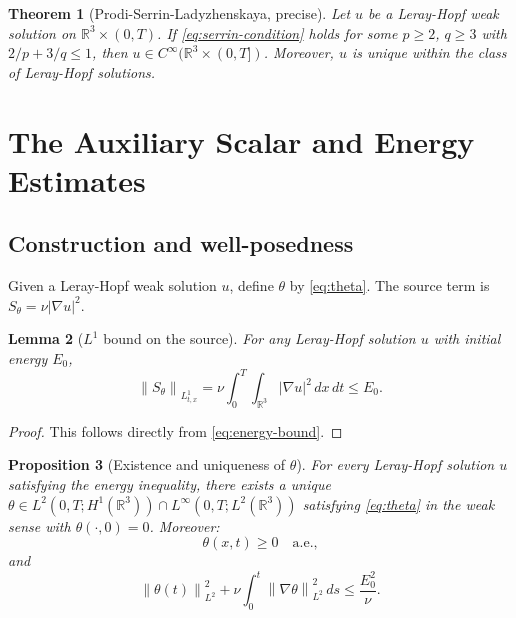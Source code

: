 \documentclass[12pt]{article}
\theoremstyle{plain}
\newtheorem{theorem}{Theorem}[section]
\newtheorem{lemma}[theorem]{Lemma}
\newtheorem{proposition}[theorem]{Proposition}
\theoremstyle{definition}
\theoremstyle{remark}
\newcommand{\R}{\mathbb{R}}
\newcommand{\norm}[1]{\left\|#1\right\|}
\newcommand{\abs}[1]{\left|#1\right|}
\newcommand{\grad}{\nabla}
\begin{document}
\begin{theorem}[Prodi-Serrin-Ladyzhenskaya, precise]\label{thm:LPS-precise}
  Let $u$ be a Leray-Hopf weak solution on $\R^3\times(0,T)$.
  If \eqref{eq:serrin-condition} holds for some $p\geq 2$, $q\geq 3$
  with $2/p+3/q\leq 1$, then $u\in C^\infty(\R^3\times(0,T])$.
  Moreover, $u$ is unique within the class of Leray-Hopf solutions.
\end{theorem}

\section{The Auxiliary Scalar and Energy Estimates}\label{sec:theta}

\subsection{Construction and well-posedness}

Given a Leray-Hopf weak solution $u$, define $\theta$ by \eqref{eq:theta}.
The source term is $S_\theta = \nu\abs{\grad u}^2$.

\begin{lemma}[$L^1$ bound on the source]\label{lem:source-L1}
  For any Leray-Hopf solution $u$ with initial energy $E_0$,
  \[
    \norm{S_\theta}_{L^1_{t,x}}
    = \nu\int_0^T\!\!\int_{\R^3}\abs{\grad u}^2\,dx\,dt
    \leq E_0.
  \]
\end{lemma}

\begin{proof}
  This follows directly from \eqref{eq:energy-bound}.
\end{proof}

\begin{proposition}[Existence and uniqueness of $\theta$]\label{prop:theta-wellposed}
  For every Leray-Hopf solution $u$ satisfying the energy inequality, there exists a
  unique $\theta\in L^2(0,T;H^1(\R^3))\cap L^\infty(0,T;L^2(\R^3))$ satisfying
  \eqref{eq:theta} in the weak sense with $\theta(\cdot,0)=0$.
  Moreover:
  \begin{equation}\label{eq:theta-non-negative}
    \theta(x,t) \geq 0 \quad \text{a.e.,}
  \end{equation}
  and
  \begin{equation}\label{eq:theta-L2-bound}
    \norm{\theta(t)}_{L^2}^2 + \nu\int_0^t\norm{\grad\theta}_{L^2}^2\,ds
    \leq \frac{E_0^2}{\nu}.
  \end{equation}
\end{proposition}
\end{document}
